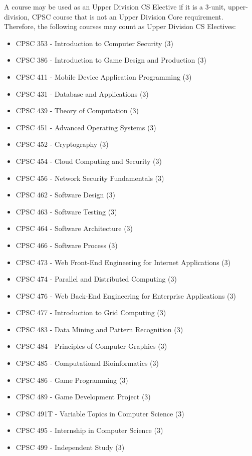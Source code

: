 \documentclass{book}
\begin{document}
A course may be used as an Upper Division CS Elective if it is a 3-unit, upper-division, CPSC course that is not an Upper Division Core requirement. Therefore, the following courses may count as Upper Division CS Electives:
\begin{itemize}
\item CPSC 353 - Introduction to Computer Security (3)
\item CPSC 386 - Introduction to Game Design and Production (3)
\item CPSC 411 - Mobile Device Application Programming (3)
\item CPSC 431 - Database and Applications (3)
\item CPSC 439 - Theory of Computation (3)
\item CPSC 451 - Advanced Operating Systems (3)
\item CPSC 452 - Cryptography (3)
\item CPSC 454 - Cloud Computing and Security (3)
\item CPSC 456 - Network Security Fundamentals (3)
\item CPSC 462 - Software Design (3)
\item CPSC 463 - Software Testing (3)
\item CPSC 464 - Software Architecture (3)
\item CPSC 466 - Software Process (3)
\item CPSC 473 - Web Front-End Engineering for Internet Applications (3)
\item CPSC 474 - Parallel and Distributed Computing (3)
\item CPSC 476 - Web Back-End Engineering for Enterprise Applications (3)
\item CPSC 477 - Introduction to Grid Computing (3)
\item CPSC 483 - Data Mining and Pattern Recognition (3)
\item CPSC 484 - Principles of Computer Graphics (3)
\item CPSC 485 - Computational Bioinformatics (3)
\item CPSC 486 - Game Programming (3)
\item CPSC 489 - Game Development Project (3)
\item CPSC 491T - Variable Topics in Computer Science (3)
\item CPSC 495 - Internship in Computer Science (3)
\item CPSC 499 - Independent Study (3)
\end{itemize}
\end{document}
